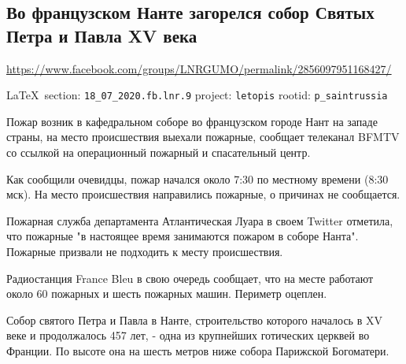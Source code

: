  
 
\subsection{Во французском Нанте загорелся собор Святых Петра и Павла XV века}
\url{https://www.facebook.com/groups/LNRGUMO/permalink/2856097951168427/}
  
\vspace{0.5cm}
{\small\LaTeX~section: \verb|18_07_2020.fb.lnr.9| project: \verb|letopis| rootid: \verb|p_saintrussia|}
\vspace{0.5cm}

Пожар возник в кафедральном соборе во французском городе Нант на западе страны,
на место происшествия выехали пожарные, сообщает телеканал BFMTV со ссылкой на
операционный пожарный и спасательный центр.

Как сообщили очевидцы, пожар начался около 7:30 по местному времени (8:30 мск).
На место происшествия направились пожарные, о причинах не сообщается.

Пожарная служба департамента Атлантическая Луара в своем Twitter отметила, что
пожарные "в настоящее время занимаются пожаром в соборе Нанта". Пожарные
призвали не подходить к месту происшествия.

Радиостанция France Bleu в свою очередь сообщает, что на месте работают около
60 пожарных и шесть пожарных машин. Периметр оцеплен.

Собор святого Петра и Павла в Нанте, строительство которого началось в XV веке
и продолжалось 457 лет, - одна из крупнейших готических церквей во Франции. По
высоте она на шесть метров ниже собора Парижской Богоматери. 
